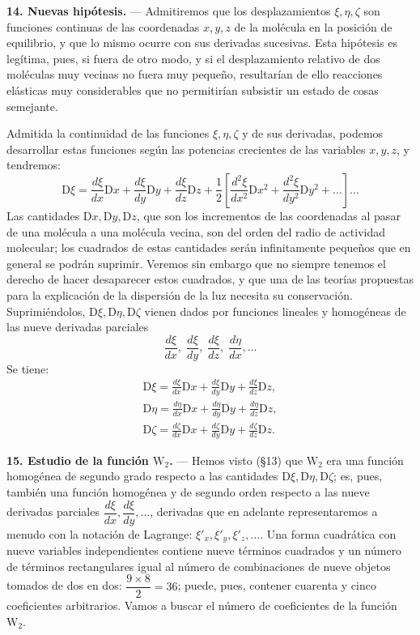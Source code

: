\noindent\textbf{14. Nuevas hipótesis.} — Admitiremos que los
desplazamientos $\xi,\eta,\zeta$ son funciones continuas de las coordenadas
$x,y,z$ de la molécula en la posición de equilibrio, y que lo mismo ocurre
con sus derivadas sucesivas. Esta hipótesis es legítima, pues, si fuera de
otro modo, y si el desplazamiento relativo de dos moléculas muy vecinas no
fuera muy pequeño, resultarían de ello reacciones elásticas muy
considerables que no permitirían subsistir un estado de cosas semejante.

Admitida la continuidad de las funciones $\xi,\eta,\zeta$ y de sus
derivadas, podemos desarrollar estas funciones según las potencias
crecientes de las variables $x,y,z$, y tendremos:
\[
\mathrm{D}\xi=\frac{d\xi}{dx}\mathrm{D}x+\frac{d\xi}{dy}\mathrm{D}y+\frac{d\xi}{dz}\mathrm{D}z
+\frac12\left[\frac{d^2\xi}{dx^2}\mathrm{D}x^2+\frac{d^2\xi}{dy^2}\mathrm{D}y^2+\ldots\right]\ldots
\]
Las cantidades $\mathrm{D}x,\mathrm{D}y,\mathrm{D}z$, que son los
incrementos de las coordenadas al pasar de una molécula a una molécula
vecina, son del orden del radio de actividad molecular; los cuadrados de
estas cantidades serán infinitamente pequeños que en general se podrán
suprimir. Veremos sin embargo que no siempre tenemos el derecho de hacer
desaparecer estos cuadrados, y que una de las teorías propuestas para la
explicación de la dispersión de la luz necesita su conservación.
Suprimiéndolos, $\mathrm{D}\xi,\mathrm{D}\eta,\mathrm{D}\zeta$ vienen dados
por funciones lineales y homogéneas de las nueve derivadas parciales
\[
\frac{d\xi}{dx},\;\frac{d\xi}{dy},\;\frac{d\xi}{dz},\;\frac{d\eta}{dx},\ldots
\]
Se tiene:
\begin{equation}
\begin{gathered}
\mathrm{D}\xi=\frac{d\xi}{dx}\mathrm{D}x+\frac{d\xi}{dy}\mathrm{D}y+\frac{d\xi}{dz}\mathrm{D}z,\\
\mathrm{D}\eta=\frac{d\eta}{dx}\mathrm{D}x+\frac{d\eta}{dy}\mathrm{D}y+\frac{d\eta}{dz}\mathrm{D}z,\\
\mathrm{D}\zeta=\frac{d\zeta}{dx}\mathrm{D}x+\frac{d\zeta}{dy}\mathrm{D}y+\frac{d\zeta}{dz}\mathrm{D}z.
\end{gathered}
\tag{21}
\end{equation}

\noindent\textbf{15. Estudio de la función $\mathrm{W}_2$.} — Hemos visto
(§13) que $\mathrm{W}_2$ era una función homogénea de segundo grado
respecto a las cantidades $\mathrm{D}\xi,\mathrm{D}\eta,\mathrm{D}\zeta$;
es, pues, también una función homogénea y de segundo orden respecto a las
nueve derivadas parciales $\dfrac{d\xi}{dx},\dfrac{d\xi}{dy},\ldots$,
derivadas que en adelante representaremos a menudo con la notación de
Lagrange: $\xi'_x,\xi'_y,\xi'_z,\ldots$. Una forma cuadrática con nueve
variables independientes contiene nueve términos cuadrados y un número de
términos rectangulares igual al número de combinaciones de nueve objetos
tomados de dos en dos: $\dfrac{9\times 8}{2}=36$; puede, pues, contener
cuarenta y cinco coeficientes arbitrarios. Vamos a buscar el número de
coeficientes de la función $\mathrm{W}_2$.

